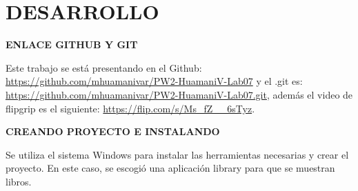 \documentclass{article}
\begin{document}
\noindent
\section*{\centering DESARROLLO}

\vspace{2\baselineskip}

\textbf{ENLACE GITHUB Y GIT}

Este trabajo se está presentando en el Github: \url{https://github.com/mhuamanivar/PW2-HuamaniV-Lab07} y el .git es: \url{https://github.com/mhuamanivar/PW2-HuamaniV-Lab07.git}, además el video de flipgrip es el siguiente: \url{https://flip.com/s/Ms_fZ__6sTyz}.

\vspace{2\baselineskip}

\textbf{CREANDO PROYECTO E INSTALANDO}

Se utiliza el sistema Windows para instalar las herramientas necesarias y crear el proyecto. En este caso, se escogió una aplicación library para que se muestran libros.

\vspace{\baselineskip}
\end{document}
